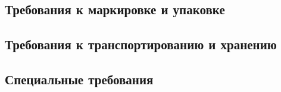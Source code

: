\subsection{Требования к маркировке и упаковке}
    \label{sec:req:ship}

\subsection{Требования к транспортированию и хранению}
    \label{sec:req:data}

\subsection{Специальные требования}
    \label{sec:req:etc}


